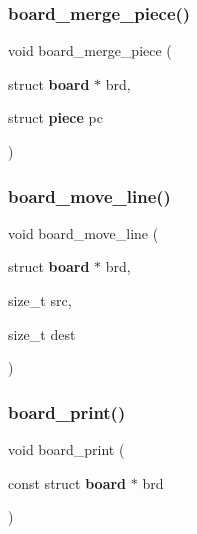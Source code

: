 \mbox{\label{board_8h_a7b287e4e327ee01cc4d8fecfc9f580d7}} 
\subsubsection{board\+\_\+merge\+\_\+piece()}
{\footnotesize\ttfamily void board\+\_\+merge\+\_\+piece (\begin{DoxyParamCaption}\item[{struct \textbf{ board} $\ast$}]{brd,  }\item[{struct \textbf{ piece}}]{pc }\end{DoxyParamCaption})\hspace{0.3cm}{\ttfamily [inline]}}

\mbox{\label{board_8h_a0d12914ac12389ecbfe2181d6d37ca56}} 
\subsubsection{board\+\_\+move\+\_\+line()}
{\footnotesize\ttfamily void board\+\_\+move\+\_\+line (\begin{DoxyParamCaption}\item[{struct \textbf{ board} $\ast$}]{brd,  }\item[{size\+\_\+t}]{src,  }\item[{size\+\_\+t}]{dest }\end{DoxyParamCaption})\hspace{0.3cm}{\ttfamily [inline]}}

\mbox{\label{board_8h_a5b330150c360732662e8ade21782ceab}} 
\subsubsection{board\+\_\+print()}
{\footnotesize\ttfamily void board\+\_\+print (\begin{DoxyParamCaption}\item[{const struct \textbf{ board} $\ast$}]{brd }\end{DoxyParamCaption})\hspace{0.3cm}{\ttfamily [inline]}}


